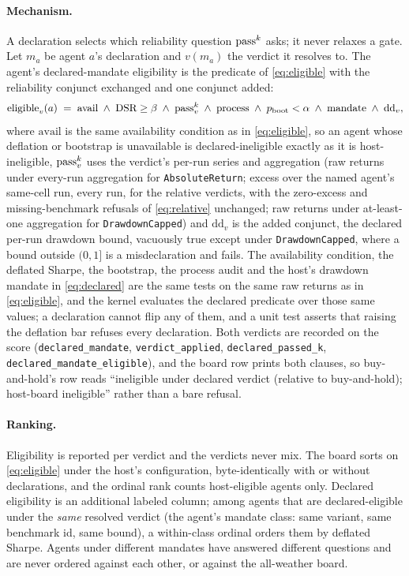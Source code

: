 \paragraph{Mechanism.} A declaration selects which reliability question $\text{pass}^{k}$ asks; it never relaxes a gate. Let $m_a$ be agent $a$'s declaration and $v(m_a)$ the verdict it resolves to. The agent's declared-mandate eligibility is the predicate of \cref{eq:eligible} with the reliability conjunct exchanged and one conjunct added:
\begin{equation}\label{eq:declared}
\text{eligible}_{v}(a) \;=\; \text{avail} \;\wedge\; \text{DSR} \ge \beta \;\wedge\; \text{pass}^{k}_{v} \;\wedge\; \text{process} \;\wedge\; p_{\text{boot}} < \alpha \;\wedge\; \text{mandate} \;\wedge\; \text{dd}_{v},
\end{equation}
where $\text{avail}$ is the same availability condition as in \cref{eq:eligible}, so an agent whose deflation or bootstrap is unavailable is declared-ineligible exactly as it is host-ineligible, $\text{pass}^{k}_{v}$ uses the verdict's per-run series and aggregation (raw returns under every-run aggregation for \texttt{AbsoluteReturn}; excess over the named agent's same-cell run, every run, for the relative verdicts, with the zero-excess and missing-benchmark refusals of \cref{eq:relative} unchanged; raw returns under at-least-one aggregation for \texttt{DrawdownCapped}) and $\text{dd}_{v}$ is the added conjunct, the declared per-run drawdown bound, vacuously true except under \texttt{DrawdownCapped}, where a bound outside $(0, 1]$ is a misdeclaration and fails. The availability condition, the deflated Sharpe, the bootstrap, the process audit and the host's drawdown mandate in \cref{eq:declared} are the same tests on the same raw returns as in \cref{eq:eligible}, and the kernel evaluates the declared predicate over those same values; a declaration cannot flip any of them, and a unit test asserts that raising the deflation bar refuses every declaration. Both verdicts are recorded on the score (\texttt{declared\_mandate}, \texttt{verdict\_applied}, \texttt{declared\_passed\_k}, \texttt{declared\_mandate\_eligible}), and the board row prints both clauses, so buy-and-hold's row reads ``ineligible under declared verdict (relative to buy-and-hold); host-board ineligible'' rather than a bare refusal.

\paragraph{Ranking.} Eligibility is reported per verdict and the verdicts never mix. The board sorts on \cref{eq:eligible} under the host's configuration, byte-identically with or without declarations, and the ordinal rank counts host-eligible agents only. Declared eligibility is an additional labeled column; among agents that are declared-eligible under the \emph{same} resolved verdict (the agent's mandate class: same variant, same benchmark id, same bound), a within-class ordinal orders them by deflated Sharpe. Agents under different mandates have answered different questions and are never ordered against each other, or against the all-weather board.

